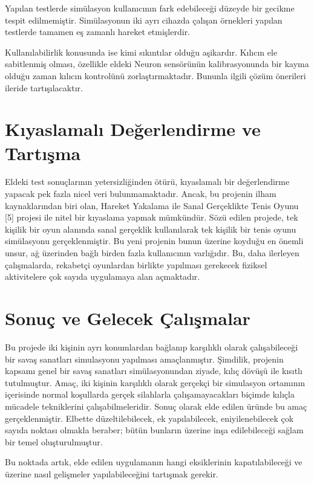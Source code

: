 \documentclass[a4paper, 12pt, titlepage]{article}
\begin{document}
Yapılan testlerde simülasyon kullanıcının fark edebileceği düzeyde bir gecikme tespit edilmemiştir.
Simülasyonun iki ayrı cihazda çalışan örnekleri yapılan testlerde tamamen eş zamanlı hareket
etmişlerdir.

Kullanılabilirlik konusunda ise kimi sıkıntılar olduğu aşikardır. Kılıcın ele sabitlenmiş olması,
özellikle eldeki Neuron sensörünün kalibrasyonunda bir kayma olduğu zaman kılıcın kontrolünü
zorlaştırmaktadır. Bununla ilgili çözüm önerileri ileride tartışılacaktır.

\newpage
\section{Kıyaslamalı Değerlendirme ve Tartışma}
Eldeki test sonuçlarının yetersizliğinden ötürü, kıyaslamalı bir değerlendirme yapacak pek fazla
nicel veri bulunmamaktadır. Ancak, bu projenin ilham kaynaklarından biri olan, Hareket Yakalama ile
Sanal Gerçeklikte Tenis Oyunu [5] projesi ile nitel bir kıyaslama yapmak mümkündür. Sözü edilen
projede, tek kişilik bir oyun alanında sanal gerçeklik kullanılarak tek kişilik bir tenis oyunu
simülasyonu gerçeklenmiştir. Bu yeni projenin bunun üzerine koyduğu en önemli unsur, ağ üzerinden
bağlı birden fazla kullanıcının varlığıdır. Bu, daha ilerleyen çalışmalarda, rekabetçi oyunlardan
birlikte yapılması gerekecek fiziksel aktivitelere çok sayıda uygulamaya alan açmaktadır.

\newpage
\section{Sonuç ve Gelecek Çalışmalar}
Bu projede iki kişinin ayrı konumlardan bağlanıp karşılıklı olarak çalışabileceği bir savaş
sanatları simulasyonu yapılması amaçlanmıştır. Şimdilik, projenin kapsamı genel bir savaş sanatları
simülasyonundan ziyade, kılıç dövüşü ile kısıtlı tutulmuştur. Amaç, iki kişinin karşılıklı olarak
gerçekçi bir simulasyon ortamının içerisinde normal koşullarda gerçek silahlarla çalışamayacakları
biçimde kılıçla mücadele tekniklerini çalışabilmeleridir. Sonuç olarak elde edilen üründe bu amaç
gerçeklenmiştir. Elbette düzeltilebilecek, ek yapılabilecek, eniyilenebilecek çok sayıda noktası
olmakla beraber; bütün bunların üzerine inşa edilebileceği sağlam bir temel oluşturulmuştur.

Bu noktada artık, elde edilen uygulamanın hangi eksiklerinin kapatılabileceği ve üzerine nasıl
gelişmeler yapılabileceğini tartışmak gerekir.
\end{document}
